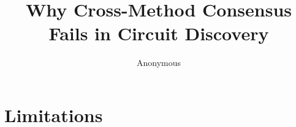 \documentclass[11pt]{article}
\title{Why Cross-Method Consensus Fails in Circuit Discovery}
\author{Anonymous}
\begin{document}
\maketitle










\section*{Limitations}




\appendix

\end{document}
